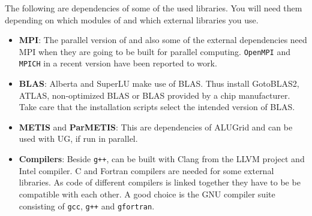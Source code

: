 The following are dependencies of some of the used libraries. You will need them
depending on which modules of \Dune and which external libraries you use.

\begin{itemize}
\item \textbf{MPI}: The parallel version of \Dune and also some of the external dependencies need MPI
  when they are going to be built for parallel computing. \texttt{OpenMPI} and \texttt{MPICH} in a recent
  version have been reported to work.

\item \textbf{BLAS}: Alberta and SuperLU make use of BLAS. Thus install GotoBLAS2, ATLAS, non-optimized BLAS
  or BLAS provided by a chip manufacturer. Take care that the installation scripts select the intended
  version of BLAS.

\item \textbf{METIS} and \textbf{ParMETIS}: This are dependencies of ALUGrid and can be used with UG, if run in parallel.

\item \textbf{Compilers}: Beside \texttt{g++}, \Dune can be built with Clang from the LLVM project and
  Intel \Cplusplus compiler. C and Fortran compilers are needed for some external libraries. As code of
  different compilers is linked together they have to be be compatible with each other. A good choice
  is the GNU compiler suite consisting of \texttt{gcc}, \texttt{g++} and \texttt{gfortran}.
\end{itemize}
